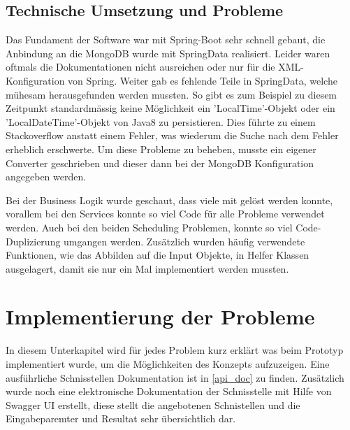 \subsection{Technische Umsetzung und Probleme}
Das Fundament der Software war mit Spring-Boot \cite{spring_boot} sehr schnell gebaut, die Anbindung an die MongoDB wurde mit SpringData \cite{spring_data} realisiert. Leider waren 
oftmals die Dokumentationen nicht ausreichen oder nur für die XML-Konfiguration von Spring. Weiter gab es fehlende Teile in SpringData, welche mühesam herausgefunden werden mussten. 
So gibt es zum Beispiel zu diesem Zeitpunkt standardmässig keine Möglichkeit ein 'LocalTime'-Objekt oder ein 'LocalDateTime'-Objekt von Java8 zu persistieren. Dies führte zu einem 
Stackoverflow anstatt einem Fehler, was wiederum die Suche nach dem Fehler erheblich erschwerte. Um diese Probleme zu beheben, musste ein eigener Converter geschrieben und dieser 
dann bei der MongoDB Konfiguration angegeben werden.

Bei der Business Logik wurde geschaut, dass viele mit  gelöst werden konnte, vorallem bei den Services konnte so viel Code für alle Probleme verwendet werden. Auch 
bei den beiden Scheduling Problemen, konnte so viel Code-Duplizierung umgangen werden. Zusätzlich wurden häufig verwendete Funktionen, wie das Abbilden auf die Input Objekte, in Helfer 
Klassen ausgelagert, damit sie nur ein Mal implementiert werden mussten.

\section{Implementierung der Probleme}\label{impl_problems}
In diesem Unterkapitel wird für jedes Problem kurz erklärt was beim Prototyp implementiert wurde, um die Möglichkeiten des Konzepts aufzuzeigen. Eine ausführliche Schnisstellen 
Dokumentation ist in \autoref{api_doc} zu finden. Zusätzlich wurde noch eine elektronische Dokumentation der Schnisstelle mit Hilfe von Swagger UI erstellt, diese stellt die angebotenen 
Schnistellen und die Eingabeparemter und Resultat sehr 
übersichtlich dar.


